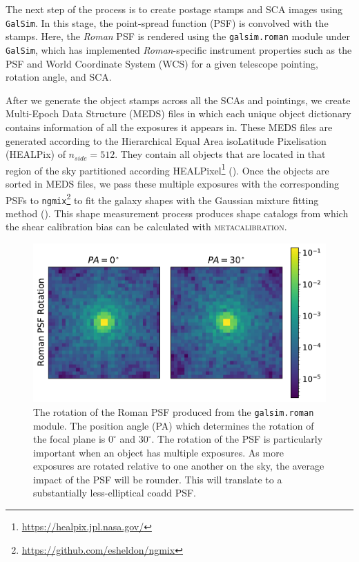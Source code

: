 \documentclass[fleqn,usenatbib]{mnras}
\begin{document}
The next step of the process is to create postage stamps and SCA images using \texttt{GalSim}. In this stage, the point-spread function (PSF) is convolved with the stamps. Here, the \emph{Roman} PSF is rendered using the \texttt{galsim.roman} module under \texttt{GalSim}, which has implemented \emph{Roman}-specific instrument properties such as the PSF and World Coordinate System (WCS) for a given telescope pointing, rotation angle, and SCA.


After we generate the object stamps across all the SCAs and pointings, we create Multi-Epoch Data Structure (MEDS) files in which each unique object dictionary contains information of all the exposures it appears in. These MEDS files are generated according to the Hierarchical Equal Area isoLatitude Pixelisation (HEALPix) of $n_{side}=512$. They contain all objects that are located in that region of the sky partitioned according HEALPixel\footnote{\url{https://healpix.jpl.nasa.gov/}} (\citealt{2005ApJ...622..759G, Zonca2019}). Once the objects are sorted in MEDS files, we pass these multiple exposures with the corresponding PSFs to \texttt{ngmix}\footnote{\url{ https://github.com/esheldon/ngmix}} to fit the galaxy shapes with the Gaussian mixture fitting method (\citealt{2014MNRAS.444L..25S}). This shape measurement process produces shape catalogs from which the shear calibration bias can be calculated with \textsc{metacalibration}.

\begin{figure}
	\includegraphics[width=\columnwidth]{psf_rotation.pdf}
    \caption{The rotation of the Roman PSF produced from the \texttt{galsim.roman} module. The position angle (PA) which determines the rotation of the focal plane is $0^{\circ}$ and $30^{\circ}$. The rotation of the PSF is particularly important when an object has multiple exposures. As more exposures are rotated relative to one another on the sky, the average impact of the PSF will be rounder. This will translate to a substantially less-elliptical coadd PSF.}
    \label{fig:psfrot}
\end{figure}
\end{document}
